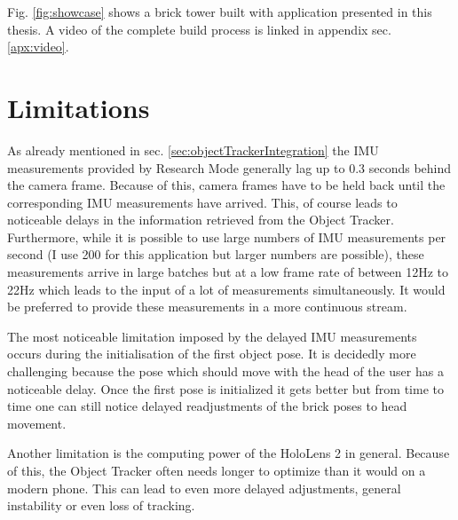 Fig. \ref{fig:showcase} shows a brick tower built with application presented in this thesis. A video of the complete build process is linked in appendix sec. \ref{apx:video}.

\section{Limitations}

As already mentioned in sec. \ref{sec:objectTrackerIntegration} the IMU measurements provided by Research Mode generally lag up to 0.3 seconds behind the camera frame. Because of this, camera frames have to be held back until the corresponding IMU measurements have arrived. This, of course leads to noticeable delays in the information retrieved from the Object Tracker. Furthermore, while it is possible to use large numbers of IMU measurements per second (I use 200 for this application but larger numbers are possible), these measurements arrive in large batches but at a low frame rate of between 12Hz to 22Hz which leads to the input of a lot of measurements simultaneously. It would be preferred to provide these measurements in a more continuous stream.

The most noticeable limitation imposed by the delayed IMU measurements occurs during the initialisation of the first object pose. It is decidedly more challenging because the pose which should move with the head of the user has a noticeable delay. Once the first pose is initialized it gets better but from time to time one can still notice delayed readjustments of the brick poses to head movement. 

Another limitation is the computing power of the HoloLens 2 in general. Because of this, the Object Tracker often needs longer to optimize than it would on a modern phone. This can lead to even more delayed adjustments, general instability or even loss of tracking.